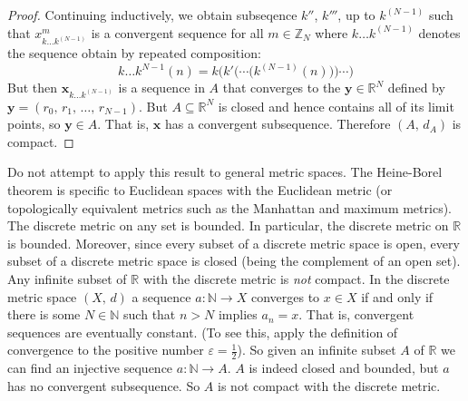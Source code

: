 \documentclass{article}
\theoremstyle{plain}
\begin{document}
\begin{proof}
            Continuing inductively, we obtain subseqence
            $k''$, $k'''$, up to $k^{(N-1)}$ such that
            $x_{k\dots{k}^{(N-1)}}^{m}$ is a convergent sequence for all
            $m\in\mathbb{Z}_{N}$ where $k\dots{k}^{(N-1)}$ denotes the sequence
            obtain by repeated composition:
            \begin{equation}
                k\dots{k}^{N-1}(n)=k\bigg(k'\Big(\cdots\big(k^{(N-1)}(n)\big)\Big)\cdots\bigg)
            \end{equation}
            But then
            $\mathbf{x}_{k\dots{k}^{(N-1)}}$ is a sequence in $A$ that converges
            to the $\mathbf{y}\in\mathbb{R}^{N}$ defined by
            $\mathbf{y}=(r_{0},\,r_{1},\,\dots,\,r_{N-1})$. But
            $A\subseteq\mathbb{R}^{N}$ is closed and hence contains all of its
            limit points, so $\mathbf{y}\in{A}$. That is, $\mathbf{x}$ has a
            convergent subsequence. Therefore $(A,\,d_{A})$ is compact.
        \end{proof}
        Do not attempt to apply this result to general metric spaces. The
        Heine-Borel theorem is specific to Euclidean spaces with the Euclidean
        metric (or topologically equivalent metrics such as the Manhattan and
        maximum metrics). The discrete metric on any set is bounded. In
        particular, the discrete metric on $\mathbb{R}$ is bounded. Moreover,
        since every subset of a discrete metric space is open, every subset of
        a discrete metric space is closed (being the complement of an open set).
        Any infinite subset of $\mathbb{R}$ with the discrete metric is
        \textit{not} compact. In the discrete metric space $(X,\,d)$ a sequence
        $a:\mathbb{N}\rightarrow{X}$ converges to $x\in{X}$ if and only if
        there is some $N\in\mathbb{N}$ such that $n>N$ implies
        $a_{n}=x$. That is, convergent sequences are eventually constant.
        (To see this, apply the definition of convergence to the positive
        number $\varepsilon=\frac{1}{2}$). So given an infinite subset $A$ of
        $\mathbb{R}$ we can find an injective sequence
        $a:\mathbb{N}\rightarrow{A}$. $A$ is indeed closed and bounded, but
        $a$ has no convergent subsequence. So $A$ is not compact with the
        discrete metric.
\end{document}
